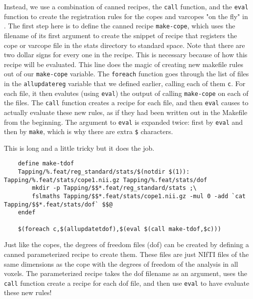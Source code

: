 Instead, we use a combination of canned recipes, the \texttt{call}
function, and the \texttt{eval} function to create the registration
rules for the copes and varcopes "on the fly" in \maken{}. The first
step here is to define the canned recipe \texttt{make-cope}, which
uses the filename of its first argument to create the snippet of
recipe that registers the cope or varcope file in the stats directory
to standard space. Note that there are two dollar signs for every one
in the recipe. This is necessary because of how this recipe will be
evaluated.  This line does the magic of creating new makefile
rules out of our \texttt{make-cope} variable. The \texttt{foreach}
function goes through the list of files in the \texttt{allupdatereg}
variable that we defined earlier, calling each of them \texttt{c}. For
each file, it then evalutes (using \texttt{eval}) the output of
calling \texttt{make-cope} on each of the files.  The \texttt{call}
function creates a \maken{} recipe for each file, and then
\texttt{eval} causes \maken{} to actually evaluate these new rules, as
if they had been written out in the Makefile from the beginning. 
The argument to \texttt{eval} is expanded twice: first by
\texttt{eval} and then by \texttt{make}, which is why there are extra
\texttt{\$} characters. 

This is long and a little tricky but it does the job.

\begin{lstlisting}
	define make-tdof 
	Tapping/%.feat/reg_standard/stats/$(notdir $(1)): Tapping/%.feat/stats/cope1.nii.gz Tapping/%.feat/stats/dof 
		mkdir -p Tapping/$$*.feat/reg_standard/stats ;\
		fslmaths Tapping/$$*.feat/stats/cope1.nii.gz -mul 0 -add `cat Tapping/$$*.feat/stats/dof` $$@
	endef 

	$(foreach c,$(allupdatetdof),$(eval $(call make-tdof,$c))) 
\end{lstlisting}
Just like the copes, the degrees of freedom files (dof) can be 
created by defining a canned parameterized recipe to create 
them. These files are just NIfTI files of the same dimensions as the 
cope with the degrees of freedom of the analysis in all voxels.  The 
parameterized recipe takes the dof filename as an argument, uses the \texttt{call}
function create a \maken{} recipe for each dof file, and then use 
\texttt{eval} to have \maken{} evaluate these new rules!


